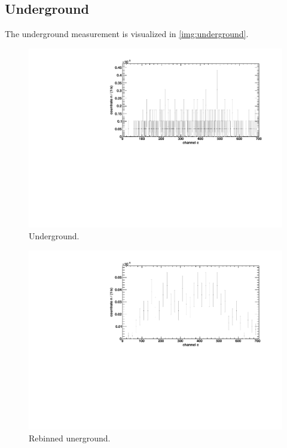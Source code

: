 \subsection{Underground}
The underground measurement is visualized in \autoref{img:underground}.
\begin{figure}[H]
\begin{center}
  \includegraphics[width=\textwidth]{../img/underground.pdf}
  \caption{Underground.}
  \label{img:underground}
\end{center}
\end{figure}

\begin{figure}[H]
\begin{center}
  \includegraphics[width=\textwidth]{../img/underground_rebin.pdf}
  \caption{Rebinned unerground.}
  \label{img:underground:rebin}
\end{center}
\end{figure}

